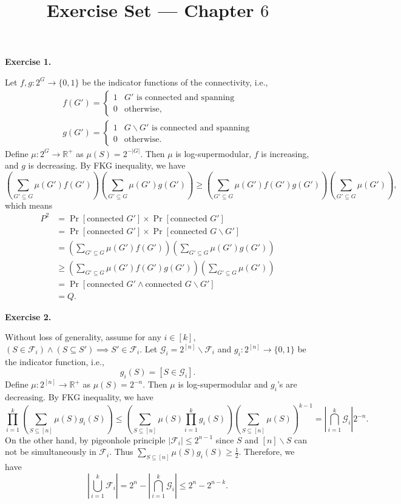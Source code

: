 \documentclass[a4paper]{article}
\title{Exercise Set --- Chapter $6$}
\date{}
\newenvironment{exercise}[1]{
	\par
	\noindent\textbf{Exercise #1.}\quad
}{
	\par
	\bigskip
}
\newcommand{\abs}[1]{\left| #1 \right|}
\newcommand{\pbra}[1]{\left( #1 \right)}
\newcommand{\sbra}[1]{\left[ #1 \right]}
\newcommand{\bin}{\{0,1\}}
\newcommand{\Rbb}{\mathbb{R}}
\newcommand{\Fcal}{\mathcal{F}}
\newcommand{\Gcal}{\mathcal{G}}
\begin{document}
\maketitle

\begin{exercise}{1}
    Let $f,g:2^{G}\to\bin$ be the indicator functions of the connectivity, i.e.,
    \begin{gather*}
        f(G')=\begin{cases}
            1 & G'\text{ is connected and spanning}\\
            0 & \text{otherwise},
        \end{cases}\\
        g(G')=\begin{cases}
            1 & G\backslash G'\text{ is connected and spanning}\\
            0 & \text{otherwise}.
        \end{cases}
    \end{gather*}
    Define $\mu:2^{G}\to\Rbb^+$ as $\mu(S)=2^{-|G|}$. Then $\mu$ is log-supermodular, $f$ is increasing, and $g$ is decreasing.
    By FKG inequality, we have
    $$
    \pbra{\sum_{G'\subseteq G}\mu(G')f(G')}\pbra{\sum_{G'\subseteq G}\mu(G')g(G')}\geq
    \pbra{\sum_{G'\subseteq G}\mu(G')f(G')g(G')}\pbra{\sum_{G'\subseteq G}\mu(G')},
    $$
    which means
    \begin{align*}
        P^2&=\Pr\sbra{\text{connected }G'}\times\Pr\sbra{\text{connected }G'}\\
        &=\Pr\sbra{\text{connected }G'}\times\Pr\sbra{\text{connected }G\backslash G'}\\
        &=\pbra{\sum_{G'\subseteq G}\mu(G')f(G')}\pbra{\sum_{G'\subseteq G}\mu(G')g(G')}\\
        &\geq\pbra{\sum_{G'\subseteq G}\mu(G')f(G')g(G')}\pbra{\sum_{G'\subseteq G}\mu(G')}\\
        &=\Pr\sbra{\text{connected }G'\land\text{connected }G\backslash G'}\\
        &=Q.
    \end{align*}
\end{exercise}

\begin{exercise}{2}
    Without loss of generality, assume for any $i\in[k]$, $\pbra{S\in\Fcal_i}\land\pbra{S\subseteq S'}\implies S'\in\Fcal_i$.
    Let $\Gcal_i=2^{[n]}\backslash\Fcal_i$ and $g_i:2^{[n]}\to\bin$ be the indicator function, i.e.,
    $$
    g_i(S)=[S\in\Gcal_i].
    $$
    Define $\mu:2^{[n]}\to\Rbb^+$ as $\mu(S)=2^{-n}$. Then $\mu$ is log-supermodular and $g_i$'s are decreasing.
    By FKG inequality, we have 
    $$
    \prod_{i=1}^k\pbra{\sum_{S\subseteq[n]}\mu(S)g_i(S)}\leq\pbra{\sum_{S\subseteq[n]}\mu(S)\prod_{i=1}^kg_i(S)}
    \pbra{\sum_{S\subseteq[n]}\mu(S)}^{k-1}=\abs{\bigcap_{i=1}^k\Gcal_i}2^{-n}.
    $$
    On the other hand, by pigeonhole principle $\abs{\Fcal_i}\leq2^{n-1}$ since $S$ and $[n]\backslash S$ 
    can not be simultaneously in $\Fcal_i$. Thus $\sum_{S\subseteq[n]}\mu(S)g_i(S)\geq\frac12$. Therefore, we have
    $$
    \abs{\bigcup_{i=1}^k\Fcal_i}=2^n-\abs{\bigcap_{i=1}^k\Gcal_i}\leq2^n-2^{n-k}.
    $$
\end{exercise}
\end{document}

